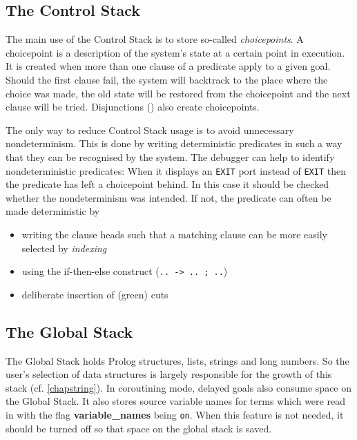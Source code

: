 \subsection{The Control Stack}
\label{controlstack}
The main use of the Control Stack is to store so-called {\it choicepoints}.
A choicepoint is a description of the system's state at a certain point
in execution.
It is created when more than one clause of a predicate apply to a given goal.
Should the first clause fail, the system will backtrack
to the place where the choice was made, the old state will be restored
from the choicepoint and the next clause will be tried.
Disjunctions () also create choicepoints.

The only way to reduce Control Stack usage is to avoid unnecessary
nondeterminism.
This is done by writing deterministic predicates in such a way that they
can be recognised by the system.
The debugger can help to identify nondeterministic predicates:
When it displays an {\tt *EXIT} port instead of {\tt EXIT} then the predicate
has left a choicepoint behind.
In this case it should be checked whether the nondeterminism was intended.
If not, the predicate can often be made deterministic by
\begin{itemize}
\item writing the clause heads such that a matching clause can be more
easily selected by {\it indexing}
\item using the if-then-else construct ({\tt .. -> .. ; ..})
\item deliberate insertion of (green) cuts
\end{itemize}


\subsection{The Global Stack}
The Global Stack holds Prolog structures, lists, strings and long numbers.
So the user's selection of data structures is largely responsible
for the growth of this stack (cf. \ref{chapstring}).
In coroutining mode, delayed goals also consume space on the Global Stack.
It also stores source variable names for terms which
were read in with the flag {\bf variable_names} being {\tt on}.
When this feature is not needed, it should be turned off
so that space on the global stack is saved.

